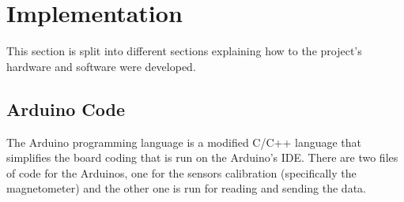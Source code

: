 

%

\chapter{Implementation}
\label{cha:implementation}

This section is split into different sections explaining how to the project's hardware and software were developed.








\section{Arduino Code}
\label{sec:arduinoCode}

The Arduino programming language is a modified C/C++ language that simplifies the board coding that is run on the Arduino's IDE.
There are two files of code for the Arduinos, one for the sensors calibration (specifically the magnetometer) and the other one is run for reading and sending the data.


